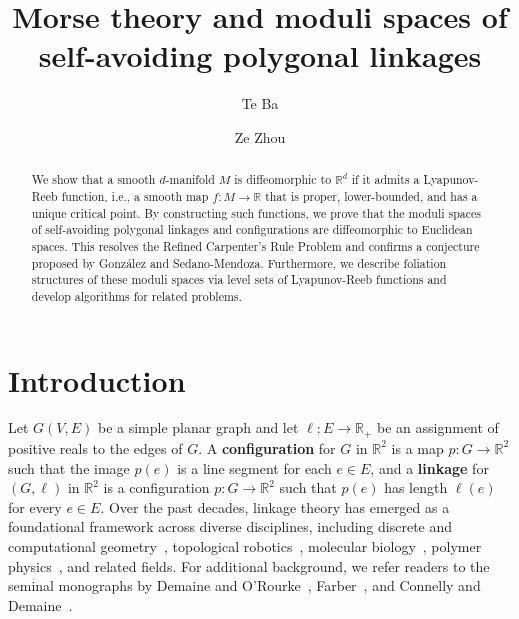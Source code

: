 \documentclass[11pt,letterpaper]{amsart}
\theoremstyle{plain}
\theoremstyle{definition}
\theoremstyle{remark}
\numberwithin{equation}{section}
\begin{document}


\title[Moduli spaces of self-avoiding linkages]{Morse theory and moduli spaces of self-avoiding polygonal linkages}


\author{Te Ba}
\address{School of Mathematics, Hunan University, Changsha 410082, China}
\author{Ze Zhou}
\address{School of Mathematical Sciences, Shenzhen University,  Shenzhen 518060, China }

\date{}



\begin{abstract}
We show that a smooth $d$-manifold $M$ is diffeomorphic to $\mathbb R^d$ if it admits a Lyapunov-Reeb function, i.e., a smooth map $f:M\to\mathbb R$ that is proper, lower-bounded, and has a unique critical point. By constructing such functions, we prove that the moduli spaces of self-avoiding polygonal linkages and configurations are diffeomorphic to Euclidean spaces. This resolves the Refined Carpenter's Rule Problem and confirms a conjecture proposed by Gonz\'{a}lez and Sedano-Mendoza. Furthermore, we describe foliation structures of these moduli spaces via level sets of Lyapunov-Reeb functions and develop algorithms for related problems.
\end{abstract}

\maketitle

\section{Introduction}\label{S-1}
Let $G(V,E)$ be a simple planar graph and let $\ell:E\to\mathbb{R}_+$ be an assignment of positive reals to the edges of $G$. A \textbf{configuration} for $G$ in $\mathbb R^2$ is a map $p:G\to\mathbb R^{2}$ such that the image $p(e)$ is a line segment for each $e\in E$, and a \textbf{linkage} for $(G,\ell)$ in $\mathbb R^2$ is a configuration $p: G\to \mathbb R^{2}$ such that $p(e)$ has length $\ell(e)$ for every $e\in E$.  Over the past decades, linkage theory has emerged as a foundational framework across diverse disciplines, including discrete and computational geometry~\cite{Hopcroft-1985,Alt-2003}, topological robotics~\cite{Lumelsky-1987}, molecular biology~\cite{Aichholzer-2003}, polymer physics~\cite{Frank-Kamenetskii-1997}, and related fields. For additional background, we refer readers to the seminal monographs by Demaine and O'Rourke~\cite{Demaine-2007}, Farber~\cite{Farber-2008}, and Connelly and Demaine~\cite{Connelly-2009}.
\end{document}
